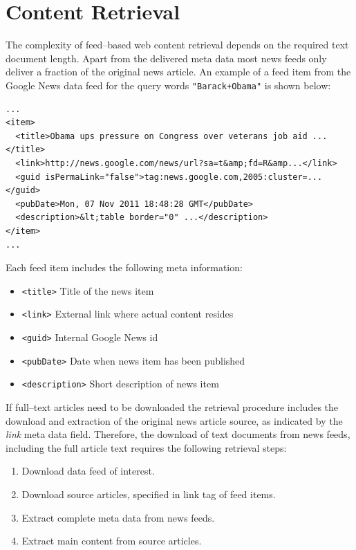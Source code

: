 \documentclass[a4paper]{article}
\let\code=\texttt
\begin{document}
\newpage
\section{Content Retrieval}
The complexity of feed--based web content retrieval depends on the required text document
length. Apart from the delivered meta data most news feeds only deliver a fraction 
of the original news article. An example of a feed item from the Google News data
feed for the query words \code{"Barack+Obama"} is shown below:


\begin{lstlisting}
...
<item>
  <title>Obama ups pressure on Congress over veterans job aid ...</title>
  <link>http://news.google.com/news/url?sa=t&amp;fd=R&amp...</link>
  <guid isPermaLink="false">tag:news.google.com,2005:cluster=...</guid>
  <pubDate>Mon, 07 Nov 2011 18:48:28 GMT</pubDate>
  <description>&lt;table border="0" ...</description>
</item>
...
\end{lstlisting}

Each feed item includes the following meta information:
\begin{itemize}
  \item \code{<title>} Title of the news item
  \item \code{<link>} External link where actual content resides
  \item \code{<guid>} Internal Google News id
  \item \code{<pubDate>} Date when news item has been published
  \item \code{<description>} Short description of news item
\end{itemize} 

If full--text articles need to be downloaded the retrieval
procedure includes the download and extraction of the original news article
source, as indicated by the \textit{link} meta data field. Therefore, the 
download of text documents from news feeds, including the full article text
requires the following retrieval steps:
\begin{enumerate}
\item Download data feed of interest.
\item Download source articles, specified in link tag of feed items.
\item Extract complete meta data from news feeds.
\item Extract main content from source articles.
\end{enumerate}
\end{document}
